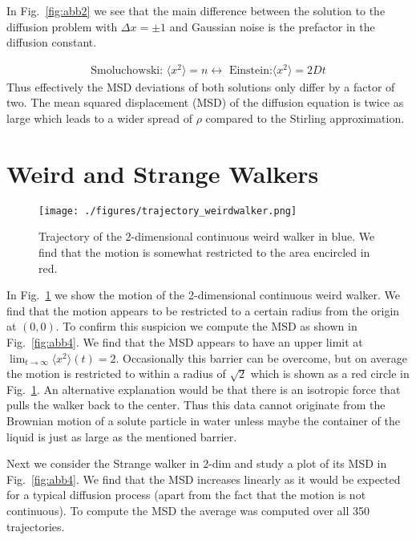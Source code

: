 \documentclass[12pt]{article}
\begin{document}
 
 
 

 
 
 
 
 
 
In Fig.~\ref{fig:abb2} we see that the main difference between the solution to the diffusion
problem with $\Delta x = \pm 1$ and Gaussian noise is the prefactor in the diffusion constant.
 
\begin{align}
  \text{Smoluchowski: }
  \langle x^2 \rangle = n \leftrightarrow \text{ Einstein:}
  \langle x^2 \rangle = 2 D t
\end{align}
Thus effectively the MSD deviations of both solutions only differ by a factor of two.
The mean squared displacement (MSD) of the diffusion equation is twice as large which leads to
a wider spread of $\rho$ compared to the Stirling approximation.
 
 
 
\section{Weird and Strange Walkers}
 
\begin{figure}[H]
  \centering
    \texttt{[image: ./figures/trajectory\_weirdwalker.png]}
    \caption{Trajectory of the 2-dimensional continuous weird walker in blue. We find that the 
            motion is somewhat restricted to the area encircled in red.}
    \label{fig:abb3}
  \end{figure}
In Fig.~\ref{fig:abb3} we show the motion of the 2-dimensional continuous weird walker.
We find that the motion appears to be restricted to a certain radius from the origin at $(0,0)$.
To confirm this suspicion we compute the MSD as shown in Fig.~\ref{fig:abb4}. We find that the 
MSD appears to have an upper limit at $\lim_{t \rightarrow \infty} \langle x^2 \rangle (t) = 2$.
Occasionally this barrier can be overcome, but on average the motion is restricted to within a
radius of $\sqrt{2}$ which is shown as a red circle in Fig.~\ref{fig:abb3}. An alternative explanation would be that
there is an isotropic force that pulls the walker back to the center.
Thus this data cannot originate from the Brownian motion of a solute particle in water unless maybe the container of the liquid is just as large as the mentioned barrier.

 
 
Next we consider the Strange walker in 2-dim and study a plot of its MSD in Fig.~\ref{fig:abb4}. We find
that the MSD increases linearly as it would be expected for a typical diffusion process (apart from the fact
that the motion is not continuous). To compute the MSD the average was computed over all 350 trajectories.
 
\end{document}
